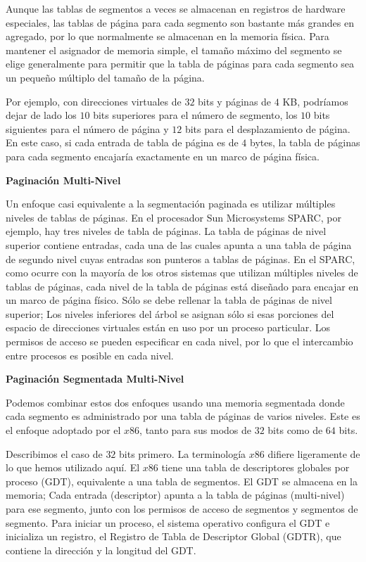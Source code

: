 \documentclass[10pt]{book}
\begin{document}
Aunque las tablas de segmentos a veces se almacenan en registros de hardware especiales, las tablas de página para cada segmento son bastante más grandes en agregado, por lo que normalmente se almacenan en la memoria física. Para mantener el asignador de memoria simple, el tamaño máximo del segmento se elige generalmente para permitir que la tabla de páginas para cada segmento sea un pequeño múltiplo del tamaño de la página.

Por ejemplo, con direcciones virtuales de $32$ bits y páginas de $4$ KB, podríamos dejar de lado los $10$ bits superiores para el número de segmento, los $10$ bits siguientes para el número de página y $12$ bits para el desplazamiento de página. En este caso, si cada entrada de tabla de página es de $4$ bytes, la tabla de páginas para cada segmento encajaría exactamente en un marco de página física.

\textbf{Paginación Multi-Nivel}

Un enfoque casi equivalente a la segmentación paginada es utilizar múltiples niveles de tablas de páginas. En el procesador Sun Microsystems SPARC, por ejemplo, hay tres niveles de tabla de páginas. La tabla de páginas de nivel superior contiene entradas, cada una de las cuales apunta a una tabla de página de segundo nivel cuyas entradas son punteros a tablas de páginas. En el SPARC, como ocurre con la mayoría de los otros sistemas que utilizan múltiples niveles de tablas de páginas, cada nivel de la tabla de páginas está diseñado para encajar en un marco de página físico. Sólo se debe rellenar la tabla de páginas de nivel superior; Los niveles inferiores del árbol se asignan sólo si esas porciones del espacio de direcciones virtuales están en uso por un proceso particular. Los permisos de acceso se pueden especificar en cada nivel, por lo que el intercambio entre procesos es posible en cada nivel.

\textbf{Paginación Segmentada Multi-Nivel}

Podemos combinar estos dos enfoques usando una memoria segmentada donde cada segmento es administrado por una tabla de páginas de varios niveles. Este es el enfoque adoptado por el $x86$, tanto para sus modos de $32$ bits como de $64$ bits.

Describimos el caso de $32$ bits primero. La terminología $x86$ difiere ligeramente de lo que hemos utilizado aquí. El $x86$ tiene una tabla de descriptores globales por proceso (GDT), equivalente a una tabla de segmentos. El GDT se almacena en la memoria; Cada entrada (descriptor) apunta a la tabla de páginas (multi-nivel) para ese segmento, junto con los permisos de acceso de segmentos y segmentos de segmento. Para iniciar un proceso, el sistema operativo configura el GDT e inicializa un registro, el Registro de Tabla de Descriptor Global (GDTR), que contiene la dirección y la longitud del GDT.
\end{document}
